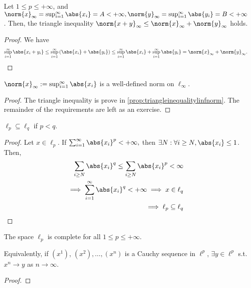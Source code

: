 \begin{proposition}\label{prop:triangleinequalitylinfnorm}
    Let $1 \leq p \leq + \infty$, and $\norm{x}_\infty = \sup_{i=1}^\infty \abs{x_i} = A < + \infty, \norm{y}_\infty = \sup_{i=1}^\infty \abs{y_i} = B < + \infty$. Then, the triangle inequality $\norm{x + y}_\infty \leq \norm{x}_\infty + \norm{y}_\infty$ holds.
\end{proposition}
\begin{proof}
    We have \begin{align*}
        \sup_{i=1}^\infty \abs{x_i + y_i} \leq \sup_{i=1}^\infty \left(\abs{x_i} + \abs{y_i}\right) \leq \sup_{i=1}^\infty \abs{x_i} + \sup_{i=1}^\infty \abs{y_i} = \norm{x}_\infty + \norm{y}_\infty.
    \end{align*}
\end{proof}
\begin{proposition}
    $\norm{x}_\infty := \sup_{i=1}^\infty \abs{x_i}$ is a well-defined norm on $\ell_\infty$.
\end{proposition}
\begin{proof}
    The triangle inequality is prove in \cref{prop:triangleinequalitylinfnorm}. The remainder of the requirements are left as an exercise.
\end{proof}
\begin{proposition}
    $\ell_p \subseteq \ell_q$ if $p < q$.
\end{proposition}
\begin{proof}
    Let $x \in \ell_p$. If $\sum_{i=1}^\infty \abs{x_i}^p < + \infty,$ then $\exists N : \forall i \geq N, \abs{x_i} \leq 1$. Then, \begin{align*}
        \sum_{i \geq N}\abs{x_i}^q \leq \sum_{i\geq N} \abs{x_i}^p < \infty\\
        \implies \sum_{i=1}^\infty \abs{x_i}^q < + \infty \implies x \in \ell_q\\
        \implies \ell_p \subseteq \ell_q
    \end{align*}
\end{proof}

\begin{theorem}
    The space $\ell_p$ is complete for all $1 \leq p \leq + \infty$. 

    Equivalently, if $(x^1)$, $(x^2), \dots, (x^n)$ is a Cauchy sequence in $\ell^p$, $\exists y \in \ell^p$ s.t. $x^n \to y$ as $n \to \infty$.
\end{theorem}

\begin{proof}
\end{proof}